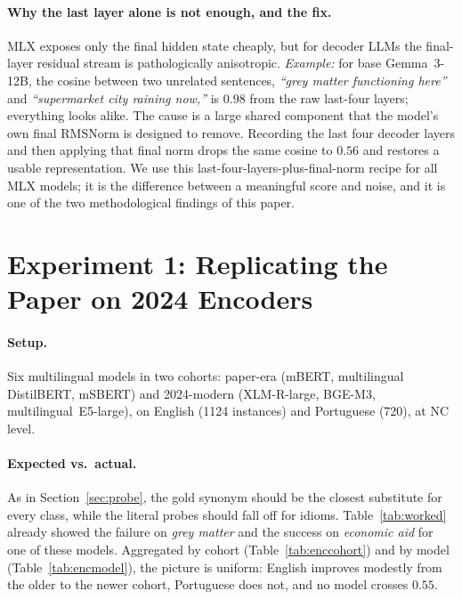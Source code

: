 \documentclass[11pt]{article}
\begin{document}
\paragraph{Why the last layer alone is not enough, and the fix.} MLX exposes only the final hidden
state cheaply, but for decoder LLMs the final-layer residual stream is pathologically anisotropic.
\emph{Example:} for base Gemma~3-12B, the cosine between two unrelated sentences, \emph{``grey matter
functioning here''} and \emph{``supermarket city raining now,''} is $0.98$ from the raw last-four
layers; everything looks alike. The cause is a large shared component that the model's own final
RMSNorm is designed to remove. Recording the last four decoder layers and then applying that final
norm drops the same cosine to $0.56$ and restores a usable representation. We use this
last-four-layers-plus-final-norm recipe for all MLX models; it is the difference between a meaningful
score and noise, and it is one of the two methodological findings of this paper.

\section{Experiment 1: Replicating the Paper on 2024 Encoders}
\label{sec:exp1}

\paragraph{Setup.} Six multilingual models in two cohorts: paper-era (mBERT, multilingual
DistilBERT, mSBERT) and 2024-modern (XLM-R-large, BGE-M3, multilingual~E5-large), on English (1124
instances) and Portuguese (720), at NC level.

\paragraph{Expected vs.\ actual.} As in Section~\ref{sec:probe}, the gold synonym should be the
closest substitute for every class, while the literal probes should fall off for idioms.
Table~\ref{tab:worked} already showed the failure on \emph{grey matter} and the success on
\emph{economic aid} for one of these models. Aggregated by cohort (Table~\ref{tab:enccohort}) and by
model (Table~\ref{tab:encmodel}), the picture is uniform: English improves modestly from the older
to the newer cohort, Portuguese does not, and no model crosses $0.55$.
\end{document}
